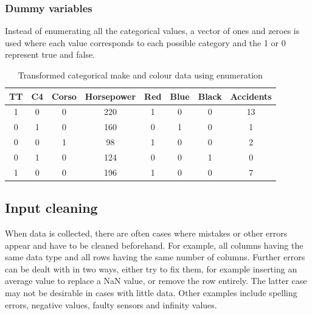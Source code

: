 \documentclass[CS5104-Notes.tex]{subfiles}
\begin{document}
\subsubsection{Dummy variables}
Instead of enumerating all the categorical values, a vector of ones and zeroes is used where each value corresponds to each possible category and the 1 or 0 represent true and false. 
\begin{table}[H]
\centering
\begin{tabular}{| c | c | c | c | c | c | c | c |}
\hline
\textbf{TT} & \textbf{C4} & \textbf{Corso} & \textbf{Horsepower} & \textbf{Red} & \textbf{Blue} & \textbf{Black} & \textbf{Accidents}\\
\hline
1 & 0 & 0 & 220 & 1 & 0 & 0 & 13 \\
\hline
0 & 1 & 0 & 160 & 0 & 1 & 0 & 1 \\
\hline
0 & 0 & 1 & 98 & 1 & 0 & 0 & 2 \\
\hline
0 & 1 & 0 & 124 & 0 & 0 & 1 & 0 \\
\hline
1 & 0 & 0 & 196 & 1 & 0 & 0 & 7 \\
\hline
\end{tabular}
\caption{Transformed categorical make and colour data using enumeration}
\end{table}

\subsection{Input cleaning}
When data is collected, there are often cases where mistakes or other errors appear and have to be cleaned beforehand. For example, all columns having the same data type and all rows having the same number of columns. Further errors can be dealt with in two ways, either try to fix them, for example inserting an average value to replace a NaN value, or remove the row entirely. The latter case may not be desirable in cases with little data. Other examples include spelling errors, negative values, faulty sensors and infinity values. 
\end{document}
